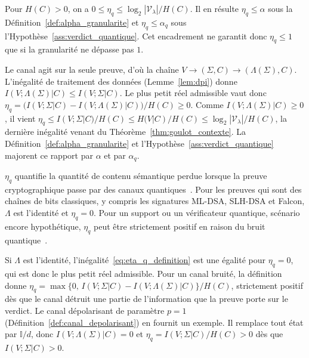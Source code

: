 \begin{sloppypar}
\begin{remark}\label{rem:encadrement_eta_q}
Pour $H(C) > 0$, on a $0 \leq \eta_q \leq \log_2|\mathcal{V}_\lambda|/H(C)$. Il en
r\'esulte $\eta_q \leq \alpha$ sous la D\'efinition~\ref{def:alpha_granularite} et
$\eta_q \leq \alpha_q$ sous l'Hypoth\`ese~\ref{ass:verdict_quantique}. Cet encadrement ne garantit donc
$\eta_q \leq 1$ que si la granularit\'e ne d\'epasse pas $1$.
\end{remark}

\begin{Preuve}
Le canal agit sur la seule preuve, d'o\`u la cha\^ine $V \to (\Sigma, C) \to
(\Lambda(\Sigma), C)$. L'in\'egalit\'e de traitement des donn\'ees
(Lemme~\ref{lem:dpi}) donne $I(V;\Lambda(\Sigma)|C) \leq I(V;\Sigma|C)$. Le plus petit
r\'eel admissible vaut donc $\eta_q = \bigl(I(V;\Sigma|C) - I(V;\Lambda(\Sigma)|C)\bigr)/H(C)
\geq 0$. Comme $I(V;\Lambda(\Sigma)|C) \geq 0$, il vient
$\eta_q \leq I(V;\Sigma|C)/H(C) \leq H(V|C)/H(C) \leq \log_2|\mathcal{V}_\lambda|/H(C)$,
la derni\`ere in\'egalit\'e venant du Th\'eor\`eme~\ref{thm:goulot_contexte}. La
D\'efinition~\ref{def:alpha_granularite} et l'Hypoth\`ese~\ref{ass:verdict_quantique}
majorent ce rapport par $\alpha$ et par $\alpha_q$.
\end{Preuve}

\begin{remark}\label{rem:interpretation_physique_pq}
$\eta_q$ quantifie la quantit\'e de contenu s\'emantique perdue lorsque la
preuve cryptographique passe par des canaux
quantiques~\cite{Zurek2003,Schumacher1997}. Pour les preuves qui sont des
cha\^ines de bits classiques, y compris les signatures ML-DSA, SLH-DSA et Falcon,
$\Lambda$ est l'identit\'e et $\eta_q = 0$. Pour un support ou un v\'erificateur
quantique, sc\'enario encore hypoth\'etique, $\eta_q$ peut \^etre strictement
positif en raison du bruit quantique~\cite{Holevo1973,Preskill2018}.
\end{remark}

\begin{Preuve}
Si $\Lambda$ est l'identit\'e, l'in\'egalit\'e~\eqref{eq:eta_q_definition} est une
\'egalit\'e pour $\eta_q = 0$, qui est donc le plus petit r\'eel admissible. Pour
un canal bruit\'e, la d\'efinition donne
$\eta_q = \max\{0,\, I(V;\Sigma|C) - I(V;\Lambda(\Sigma)|C)\}/H(C)$, strictement
positif d\`es que le canal d\'etruit une partie de l'information que la preuve
porte sur le verdict. Le canal d\'epolarisant de param\`etre $p = 1$
(D\'efinition~\ref{def:canal_depolarisant}) en fournit un exemple. Il remplace tout
\'etat par $\mathbb{I}/d$, donc $I(V;\Lambda(\Sigma)|C) = 0$ et
$\eta_q = I(V;\Sigma|C)/H(C) > 0$ d\`es que $I(V;\Sigma|C) > 0$.
\end{Preuve}


\end{sloppypar}
